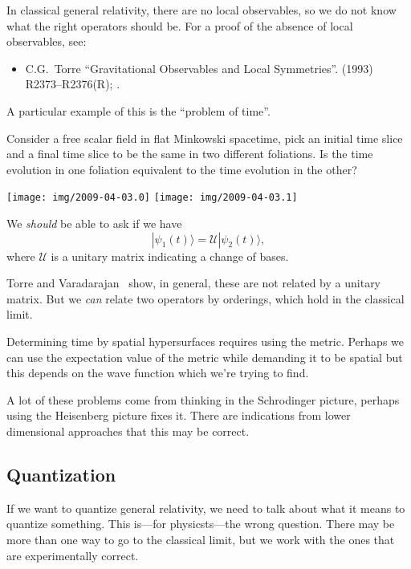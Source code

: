\lecture

In classical general relativity, there are no local observables, so we
do not know what the right operators should be.  For a proof of the
absence of local observables, see:
\begin{itemize}
\item C.G.~Torre
``Gravitational Observables and Local Symmetries''.
  (1993) R2373--R2376(R); .\newline
{\tt{}}
\end{itemize}
A particular example of this is the ``problem of time''.

Consider a free scalar field in flat Minkowski spacetime, pick an
initial time slice and a final time slice to be the same in two
different foliations.  Is the time evolution in one foliation equivalent
to the time evolution in the other?
\begin{center}
\texttt{[image: img/2009-04-03.0]}
\texttt{[image: img/2009-04-03.1]}
\end{center}
We \emph{should} be able to ask if we have
\begin{equation}
|\psi_{1}(t)\rangle = \mathcal{U}|\psi_{2}(t)\rangle,
\end{equation}
where $\mathcal{U}$ is a unitary matrix indicating a change of bases.

Torre and Varadarajan~\cite{Torre:1997zs,Torre:1998eq} show, in general,
these are not related by a unitary matrix.  But we \emph{can} relate two
operators by orderings, which hold in the classical limit.

Determining time by spatial hypersurfaces requires using the metric.
Perhaps we can use the expectation value of the metric while demanding
it to be spatial but this depends on the wave function which we're
trying to find.

A lot of these problems come from thinking in the Schrodinger picture,
perhaps using the Heisenberg picture fixes it.  There are indications
from lower dimensional approaches that this may be correct.

\subsection{Quantization}

If we want to quantize general relativity, we need to talk about what it
means to quantize something. This is---for physicsts---the wrong
question. There may be more than one way to go to the classical limit,
but we work with the ones that are experimentally correct.

